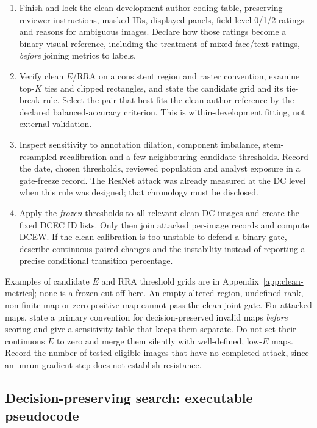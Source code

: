 \begin{enumerate}
    \item Finish and lock the clean-development author coding table, preserving reviewer instructions, masked IDs, displayed panels, field-level 0/1/2 ratings and reasons for ambiguous images. Declare how those ratings become a binary visual reference, including the treatment of mixed face/text ratings, \emph{before} joining metrics to labels.
    \item Verify clean $E$/RRA on a consistent region and raster convention, examine top-$K$ ties and clipped rectangles, and state the candidate grid and its tie-break rule. Select the pair that best fits the clean author reference by the declared balanced-accuracy criterion. This is within-development fitting, not external validation.
    \item Inspect sensitivity to annotation dilation, component imbalance, stem-resampled recalibration and a few neighbouring candidate thresholds. Record the date, chosen thresholds, reviewed population and analyst exposure in a gate-freeze record. The ResNet attack was already measured at the DC level when this rule was designed; that chronology must be disclosed.
    \item Apply the \emph{frozen} thresholds to all relevant clean DC images and create the fixed DCEC ID lists. Only then join attacked per-image records and compute DCEW. If the clean calibration is too unstable to defend a binary gate, describe continuous paired changes and the instability instead of reporting a precise conditional transition percentage.
\end{enumerate}

Examples of candidate $E$ and RRA threshold grids are in Appendix~\ref{app:clean-metrics}; none is a frozen cut-off here. An empty altered region, undefined rank, non-finite map or zero positive map cannot pass the clean joint gate. For attacked maps, state a primary convention for decision-preserved invalid maps \emph{before} scoring and give a sensitivity table that keeps them separate. Do not set their continuous $E$ to zero and merge them silently with well-defined, low-$E$ maps. Record the number of tested eligible images that have no completed attack, since an unrun gradient step does not establish resistance.

\subsection{Decision-preserving search: executable pseudocode}

